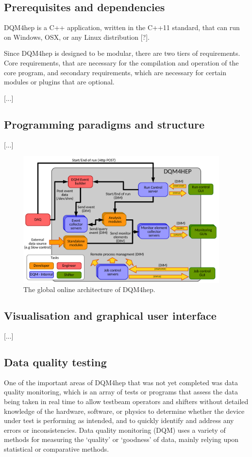 \subsection{Prerequisites and dependencies}

DQM4hep is a C++ application, written in the C++11 standard, that can run on Windows, OSX, or any Linux distribution [?]. 

Since DQM4hep is designed to be modular, there are two tiers of requirements. Core requirements, that are necessary for the compilation and operation of the core program, and secondary requirements, which are necessary for certain modules or plugins that are optional.

[...]

\subsection{Programming paradigms and structure}
[...]

\begin{figure}[h]
	\centering
	\includegraphics[width=0.95\textwidth]{../Pictures/GlobalArchitectureDiagram.pdf}
	\caption{The global online architecture of DQM4hep.}
	\label{figure:daq/dqm4hep/architecture}
\end{figure}

\subsection{Visualisation and graphical user interface}
[...]

\subsection{Data quality testing}
One of the important areas of DQM4hep that was not yet completed was data quality monitoring, which is an array of tests or programs that assess the data being taken in real time to allow testbeam operators and shifters without detailed knowledge of the hardware, software, or physics to determine whether the device under test is performing as intended, and to quickly identify and address any errors or inconsistencies. Data quality monitoring (DQM) uses a variety of methods for measuring the `quality' or `goodness' of data, mainly relying upon statistical or comparative methods.

